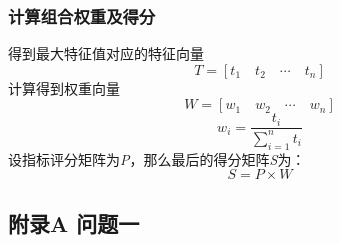 \documentclass[a4paper, 12pt]{article}
\numberwithin{equation}{section}
\begin{document}
                \subsubsection{计算组合权重及得分}
                    得到最大特征值对应的特征向量
                    \[ T = [t_1 \quad t_2 \quad \cdots \quad t_n] \]
                    \newline
                    计算得到权重向量
                    \[ W = [w_1 \quad w_2 \quad \cdots \quad w_n ] \]
                    \begin{equation*}
                        w_i = \frac{t_i}{\sum_{i=1}^{n} t_i}
                    \end{equation*}
                    \newline
                    设指标评分矩阵为\textit{P}，那么最后的得分矩阵\textit{S}为：
                    \[ S = P \times W \]

    {}


    {}


    {}


    {}
    \newpage


    {}
        \subsection*{附录A \hspace{2em} 问题一}
            
\end{document}
